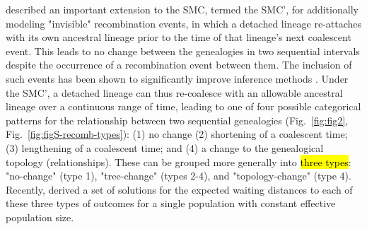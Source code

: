 \documentclass[11pt]{article}
\begin{document}
\cite{marjoram2006fast}
described an important extension to the SMC, termed the SMC', for additionally
modeling "invisible" recombination events, in which a detached lineage re-attaches
with its own ancestral lineage prior to the time of that lineage's next coalescent event. 
This leads to no change between the genealogies in two sequential intervals
despite the occurrence of a recombination event between them. The inclusion of
such events has been shown to 
significantly improve inference methods \citep{wilton2015smc}. 
Under the SMC', a detached lineage can thus re-coalesce with an allowable 
ancestral lineage over a continuous range of time, leading to one of 
four possible categorical patterns for the relationship between two
sequential genealogies
(Fig.~\ref{fig:fig2}, Fig.~\ref{fig:figS-recomb-types}): 
(1) no change %
(2) shortening of a coalescent time; (3) lengthening of a coalescent time; 
and (4) %
a change to the genealogical topology (relationships).
These can be grouped more generally into \hl{three types}: 
"no-change" (type 1), "tree-change" (types 2-4), and "topology-change"
(type 4). Recently, \citet{deng_distribution_2021} derived a set of solutions for
the expected waiting distances to each of these three types of 
outcomes for a single population with constant effective population size.
\end{document}
